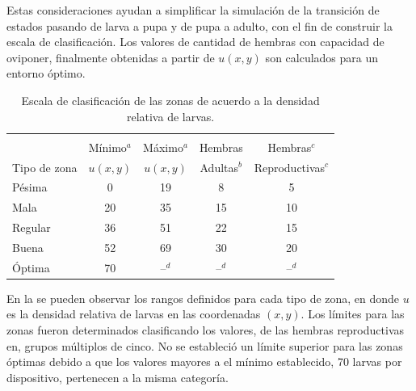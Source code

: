 Estas consideraciones ayudan a simplificar la simulación de la transición de estados pasando de
larva a pupa y de pupa a adulto, con el fin de construir la escala de clasificación. Los valores
de cantidad de hembras con capacidad de oviponer, finalmente obtenidas a partir de $u(x,y)$ son
calculados para un entorno óptimo.

\begin{table}[!hptb]
    \begin{center}
    \begin{minipage}{\textwidth}
    \begin{center}
        \caption{\label{tab:cap4-puntaje-zona} Escala de clasificación de las zonas de acuerdo a la densidad relativa de larvas.}
        \begin{tabular}{p{3cm} c c c c}
            \hline \\
                         & Mínimo$^a$ & Máximo$^a$ & Hembras     & Hembras$^c$ \\
            Tipo de zona & $u(x,y)$   & $u(x,y)$   & Adultas$^b$ & Reproductivas$^c$ \\
            \hline
            \hline
            Pésima  & 0  & 19 & 8  & 5 \\
            Mala    & 20 & 35 & 15 & 10\\
            Regular & 36 & 51 & 22 & 15\\
            Buena   & 52 & 69 & 30 & 20\\
            Óptima  & 70 & --$^d$ & --$^d$ & --$^d$\\
        \end{tabular}
    \end{center}
    \end{minipage}
    \end{center}
\end{table}

En la  se pueden observar los rangos definidos para cada tipo de
zona, en donde $u$ es la densidad relativa de larvas en las coordenadas $(x,y)$. Los límites para
las zonas fueron determinados clasificando los valores, de las hembras reproductivas en, grupos
múltiplos de cinco. No se estableció un límite superior para las zonas óptimas debido a que los
valores mayores a el mínimo establecido, 70 larvas por dispositivo, pertenecen a la misma categoría.

